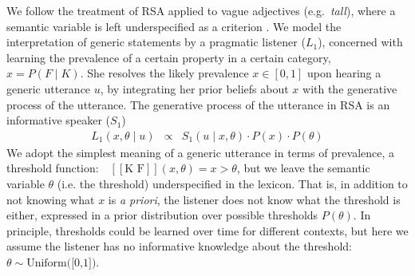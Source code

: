 \documentclass[12pt,letterpaper]{article}
\newcommand{\denote}[1]{\mbox{ $[\![ #1 ]\!]$}}
\begin{document}
We follow the treatment of RSA applied to vague adjectives (e.g.~\emph{tall}), where a semantic variable is left underspecified as a criterion \cite{Lassiter2013,Lassiter2015}.
We model the interpretation of generic statements by a pragmatic listener ($L_1$), concerned with learning the prevalence of a certain property in a certain category, $x=P(F \mid K)$.
She resolves the likely prevalence $x \in [0, 1]$ upon hearing a generic utterance $u$, by integrating her prior beliefs about $x$ with the generative process of the utterance.
The generative process of the utterance in RSA is an informative speaker ($S_1$)
%
\begin{eqnarray}
L_{1}(x , \theta \mid u) &\propto& S_{1}(u \mid x, \theta) \cdot P(x) \cdot P(\theta) \label{eq:L1}
\end{eqnarray}
%
We adopt the simplest meaning of a generic utterance in terms of prevalence, a threshold function: $\denote{\text{K F}}(x, \theta)=x>\theta$, but we leave the semantic variable $\theta$ (i.e. the threshold) underspecified in the lexicon. 
That is, in addition to not knowing what $x$ is \emph{a priori}, the listener does not know what the threshold is either, expressed in a prior distribution over possible thresholds $P(\theta)$.
In principle, thresholds could be learned over time for different contexts, but here we assume the listener has no informative knowledge about the threshold: $\theta \sim \text{Uniform([0,1])}$.
\end{document}
